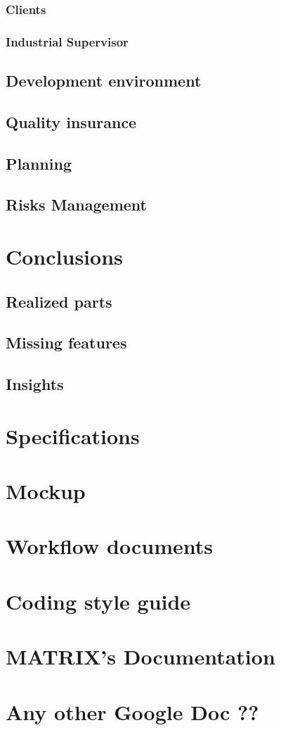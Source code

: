 \documentclass[a4paper]{report}
\begin{document}
\subsection{Clients}
\subsection{Industrial Supervisor}
\section{Development environment}
\section{Quality insurance}
\section{Planning}
\section{Risks Management}

\chapter{Conclusions}
\section{Realized parts}
\section{Missing features}
\section{Insights}

\appendix
\chapter{Specifications}
\chapter{Mockup}
\chapter{Workflow documents}
\chapter{Coding style guide}
\chapter{MATRIX's Documentation}
\chapter{Any other Google Doc ??}
\end{document}

